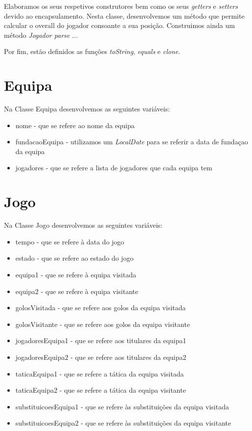 \documentclass[a4paper,12pt]{article}
\begin{document}
    Elaboramos os seus respetivos construtores bem como os seus \emph{getters} e \emph{setters} devido ao encapsulamento.
Nesta classe, desenvolvemos um método que permite calcular o overall do jogador consoante a sua posição. Construimos
ainda um método \emph{ Jogador parse} ...\par

    Por fim, estão definidos as funções \emph{toString}, \emph{equals} e \emph{clone}. \par

\section{Equipa}
    Na Classe Equipa desenvolvemos as seguintes variáveis:
    \begin{itemize}
        \item nome - que se refere ao nome da equipa
        \item fundacaoEquipa - utilizamos um \emph{LocalDate} para se referir a data de fundaçao da equipa
        \item jogadores - que se refere a lista de jogadores que cada equipa tem
    \end{itemize}



\section{Jogo}
    Na Classe Jogo desenvolvemos as seguintes variáveis:
    \begin{itemize}
        \item tempo - que se refere à data do jogo
        \item estado - que se refere ao estado do jogo
        \item equipa1 - que se refere à equipa visitada
        \item equipa2 - que se refere à equipa visitante
        \item golosVisitada - que se refere aos golos da equipa visitada
        \item golosVisitante - que se refere aos golos da equipa visitante
        \item jogadoresEquipa1 - que se refere aos titulares da equipa1
        \item jogadoresEquipa2 - que se refere aos titulares da equipa2
        \item taticaEquipa1 - que se refere a tática da equipa visitada
        \item taticaEquipa2 - que se refere a tática da equipa visitante
        \item substituicoesEquipa1 - que se refere às substituições da equipa visitada
        \item substituicoesEquipa2 - que se refere às substituições da equipa visitante
    \end{itemize}
\end{document}
